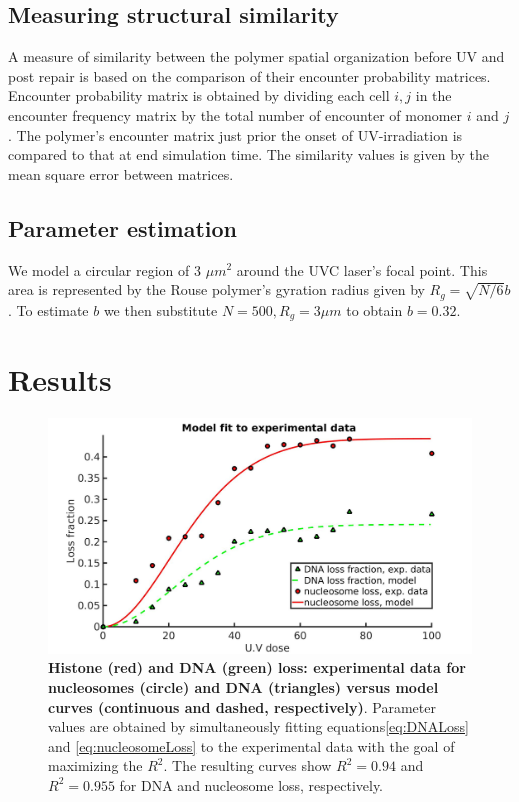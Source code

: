 \documentclass[12pt]{article}
\begin{document}
	\subsection{Measuring structural similarity}
	A measure of similarity between the polymer spatial organization before UV and post repair is based on the comparison of their encounter probability matrices. Encounter probability matrix is obtained by dividing each cell $i,j$ in the encounter frequency matrix by the total number of encounter of monomer $i$ and $j$. The polymer's encounter matrix just prior the onset of UV-irradiation is compared to that at end simulation time. The similarity values is given by the mean square error between matrices. 
	
	\subsection{Parameter estimation}
	We model a circular region of 3 $\mu m^2$ around the UVC laser's focal point. This area is represented by the Rouse polymer's gyration radius given by $R_g= \sqrt{N/6}b$. To estimate $b$ we then substitute $N=500, R_g=3\mu m$ to obtain $b=0.32$. 
	
	\section{Results}

	\begin{figure}[H]
	\centering
	\includegraphics[width=0.5\linewidth, height=0.3\textheight]{histoneAndDnaVsUvDoseModelFit}
	\caption{\textbf{Histone (red) and DNA (green) loss: experimental data
		for nucleosomes (circle) and DNA (triangles) versus model curves
		(continuous and dashed, respectively)}. Parameter values are obtained
		by simultaneously fitting equations\eqref{eq:DNALoss}  and \eqref{eq:nucleosomeLoss} to the experimental data with
		the goal of maximizing the $R^2$. The resulting curves show $R^2 = 0.94$ and
		$R^2 = 0.955$ for DNA and nucleosome loss, respectively.}
	\label{fig:histoneAndDnaVsUvDoseModelFit}
	\end{figure}
	
\end{document}
